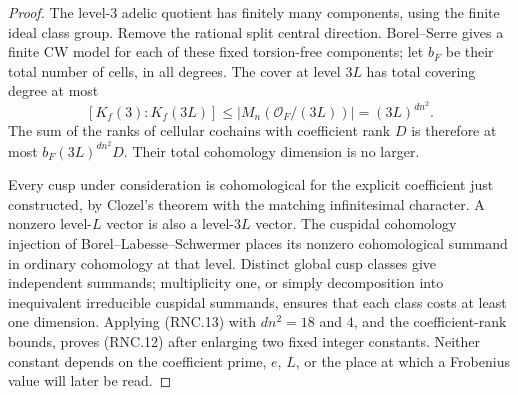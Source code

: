 \begin{proof}
The level-$3$ adelic quotient has finitely many components,
using the finite ideal class group.  Remove the rational
split central direction.  Borel--Serre gives a finite CW
model for each of these fixed torsion-free components; let
$b_F$ be their total number of cells, in all degrees.
The cover at level $3L$ has total covering degree at most
\[
 [K_f(3):K_f(3L)]\leq
 |M_n(\mathcal O_F/(3L))|=(3L)^{dn^2}.                         \tag{RNC.13}
\]
The sum of the ranks of cellular cochains with coefficient
rank $D$ is therefore at most $b_F(3L)^{dn^2}D$.
Their total cohomology dimension is no larger.

Every cusp under consideration is cohomological for the
explicit coefficient just constructed, by Clozel's theorem
with the matching infinitesimal character.  A nonzero
level-$L$ vector is also a level-$3L$ vector.  The cuspidal
cohomology injection of Borel--Labesse--Schwermer places its
nonzero cohomological summand in ordinary cohomology at
that level.  Distinct global cusp classes give independent
summands; multiplicity one, or simply decomposition into
inequivalent irreducible cuspidal summands, ensures that
each class costs at least one dimension.  Applying (RNC.13)
with $dn^2=18$ and $4$, and the coefficient-rank bounds,
proves (RNC.12) after enlarging two fixed integer constants.
Neither constant depends on the coefficient prime, $e$, $L$,
or the place at which a Frobenius value will later be read.
\end{proof}

